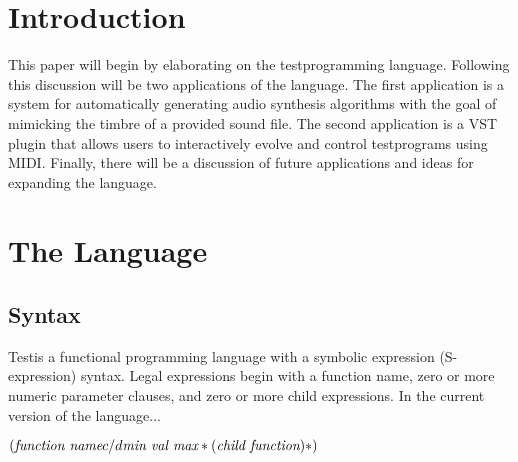 \documentclass[12pt]{article}
\newcommand{\audiolanguagenamelower}{test}
\newcommand{\audiolanguagenameupper}{Test}
\begin{document}
\maketitle

\begin{abstract}
This paper presents a novel method of digital audio synthesis using Lisp-like symbolic expressions. The developed system is an audio programming language called ``\audiolanguagenamelower'' where valid programs directly represent algorithms for audio synthesis. The symbolic expression representation is convenient from a computational standpoint as it is recursively defined and highly parallelizable. The structures can be created and manipulated through genetic programming allowing users to search for synthesis algorithms that mimic acoustic and electronic timbres. It is also possible for users to search for desirable timbres using an interactive genetic algorithm where timbres can be auditioned in real-time using MIDI.
\end{abstract}

\section{Introduction}\label{INTRO}
This paper will begin by elaborating on the \audiolanguagenamelower programming language. Following this discussion will be two applications of the language. The first application is a system for automatically generating audio synthesis algorithms with the goal of mimicking the timbre of a provided sound file. The second application is a VST plugin that allows users to interactively evolve and control \audiolanguagenamelower programs using MIDI. Finally, there will be a discussion of future applications and ideas for expanding the language.

\section{The Language}
\subsection{Syntax}\label{SYNTAX}
\audiolanguagenameupper is a functional programming language with a symbolic expression (S-expression) syntax. Legal expressions begin with a function name, zero or more numeric parameter clauses, and zero or more child expressions. In the current version of the language...

$(\emph{function name} {c/d \emph{min val max}}* (\emph{child function})*)$
\end{document}
